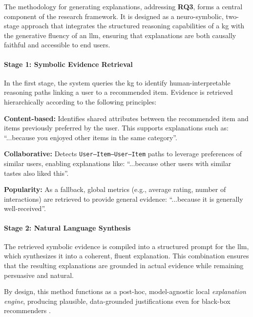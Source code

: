 The methodology for generating explanations, addressing \textbf{RQ3}, forms a central component of the research framework. It is designed as a neuro-symbolic, two-stage approach that integrates the structured reasoning capabilities of a \ac{kg} with the generative fluency of an \ac{llm}, ensuring that explanations are both causally faithful and accessible to end users.

\paragraph{Stage 1: Symbolic Evidence Retrieval}
In the first stage, the system queries the \ac{kg} to identify human-interpretable reasoning paths linking a user to a recommended item. Evidence is retrieved hierarchically according to the following principles:

\begin{compactitem}[\textbullet]
\item \textbf{Content-based:} Identifies shared attributes between the recommended item and items previously preferred by the user. This supports explanations such as: ``...because you enjoyed other items in the same category''.
\item \textbf{Collaborative:} Detects \texttt{User–Item–User–Item} paths to leverage preferences of similar users, enabling explanations like: ``...because other users with similar tastes also liked this''.
\item \textbf{Popularity:} As a fallback, global metrics (e.g., average rating, number of interactions) are retrieved to provide general evidence: ``...because it is generally well-received''.
\end{compactitem}

\paragraph{Stage 2: Natural Language Synthesis}
The retrieved symbolic evidence is compiled into a structured prompt for the \ac{llm}, which synthesizes it into a coherent, fluent explanation. This combination ensures that the resulting explanations are grounded in actual evidence while remaining persuasive and natural.

By design, this method functions as a post-hoc, model-agnostic local \textit{explanation engine}, producing plausible, data-grounded justifications even for black-box recommenders \cite{SOTA-RECSYS-EXPLAIN-KG, SOTA-MODEL-AGNOSTIC-GRAPH-EXPLANATIONS}.